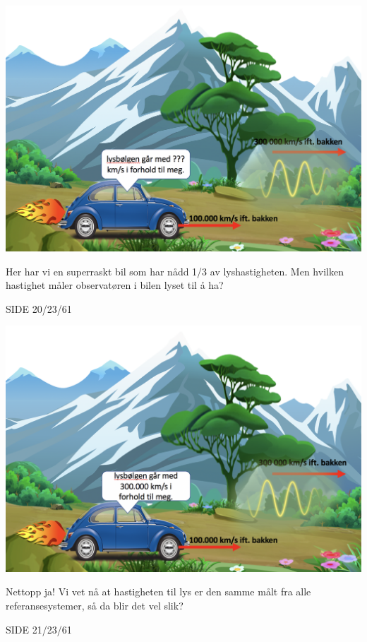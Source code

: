 \documentclass{beamer}
\begin{document}
\begin{frame}
{
  \large
\centerline{\includegraphics[scale=0.3]{media/klassrel9.png}}
Her har vi en superraskt bil som har nådd 1/3 av lyshastigheten. Men hvilken hastighet måler observatøren i bilen lyset til å ha?
}{SIDE 20/23/61}


{
  \large
\centerline{\includegraphics[scale=0.3]{media/klassrel10.png}}
Nettopp ja! Vi vet nå at hastigheten til lys er den samme målt fra alle referansesystemer, så da blir det vel slik?
}{SIDE 21/23/61}


\end{frame}
\end{document}
